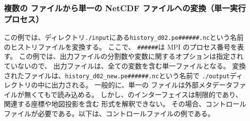 \subsubsection{複数の \scalenetcdf ファイルから単一の NetCDF ファイルへの変換（単一実行プロセス）}
%
%
この例では、ディレクトリ\verb|./input|にある\verb|history_d02.pe######.nc|という名前のヒストリファイルを変換する。
ここで、 \verb|######|は MPI のプロセス番号を表す。
この例では、出力ファイルの分割数や変数に関するオプションは指定されていないので、
出力ファイルは、全ての変数を含む単一ファイルとなる。
変換されたファイルは、\verb|history_d02_new.pe######.nc|という名前で \verb|./output|ディレクトリの中に出力される。
%
一般的に、単一の \netcdf ファイルは外部メタデータファイルが無くても{\grads}で読み込める。
しかし、\grads のインターフェイスは制限的であり、関連する座標や地図投影を含む \scalenetcdf 形式を解釈できない。
その場合、コントロールファイルが必要である。以下は、コントロールファイルの例である。
%
